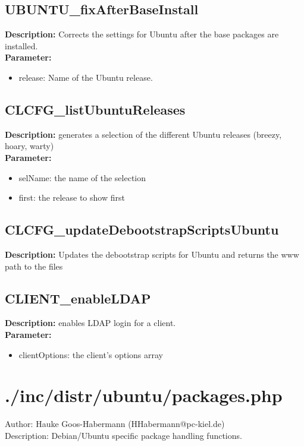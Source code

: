 \subsection{UBUNTU\_fixAfterBaseInstall}
\textbf{Description:} Corrects the settings for Ubuntu after the base packages are installed.\\
\textbf{Parameter:}
\begin{itemize}
\item release: Name of the Ubuntu release.
\end{itemize}

\subsection{CLCFG\_listUbuntuReleases}
\textbf{Description:} generates a selection of the different Ubuntu releases (breezy, hoary, warty)\\
\textbf{Parameter:}
\begin{itemize}
\item selName: the name of the selection
\item first: the release to show first
\end{itemize}

\subsection{CLCFG\_updateDebootstrapScriptsUbuntu}
\textbf{Description:} Updates the debootstrap scripts for Ubuntu and returns the www path to the files\\

\subsection{CLIENT\_enableLDAP}
\textbf{Description:} enables LDAP login for a client.\\
\textbf{Parameter:}
\begin{itemize}
\item clientOptions: the client's options array
\end{itemize}

\newpage\section{./inc/distr/ubuntu/packages.php}
 Author: Hauke Goos-Habermann (HHabermann@pc-kiel.de)\\
 Description: Debian/Ubuntu specific package handling functions.\\

